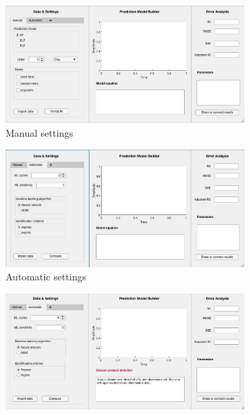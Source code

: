     \begin{figure}
        \centering
        \begin{subfigure}[b]{0.4\textwidth}
            \includegraphics[width=\textwidth]{figures/manual.png}
            \caption{Manual settings}
            \label{fig:manual}
        \end{subfigure}
        \hspace{0.1\textwidth}
        \begin{subfigure}[b]{0.4\textwidth}
            \includegraphics[width=\textwidth]{figures/auto.png}
            \caption{Automatic settings}
            \label{fig:automatic}
        \end{subfigure}
        \begin{subfigure}[b]{0.4\textwidth}
            \includegraphics[width=\textwidth]{figures/warning.png}

\end{subfigure}
\end{figure}
